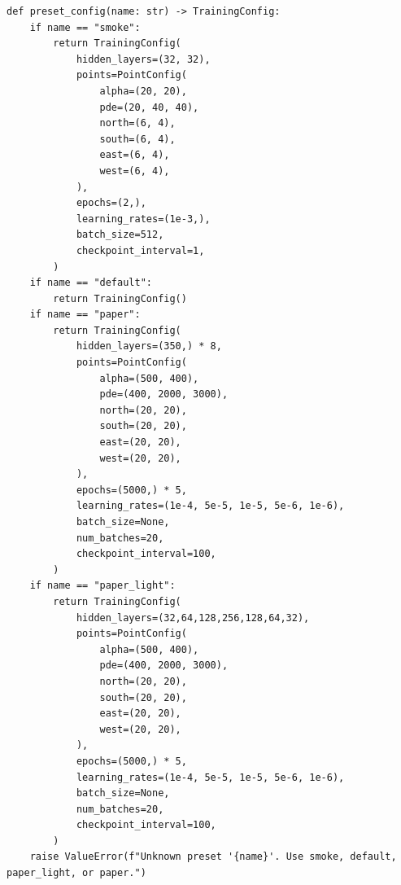 \begin{lstlisting}
def preset_config(name: str) -> TrainingConfig:
    if name == "smoke":
        return TrainingConfig(
            hidden_layers=(32, 32),
            points=PointConfig(
                alpha=(20, 20),
                pde=(20, 40, 40),
                north=(6, 4),
                south=(6, 4),
                east=(6, 4),
                west=(6, 4),
            ),
            epochs=(2,),
            learning_rates=(1e-3,),
            batch_size=512,
            checkpoint_interval=1,
        )
    if name == "default":
        return TrainingConfig()
    if name == "paper":
        return TrainingConfig(
            hidden_layers=(350,) * 8,
            points=PointConfig(
                alpha=(500, 400),
                pde=(400, 2000, 3000),
                north=(20, 20),
                south=(20, 20),
                east=(20, 20),
                west=(20, 20),
            ),
            epochs=(5000,) * 5,
            learning_rates=(1e-4, 5e-5, 1e-5, 5e-6, 1e-6),
            batch_size=None,
            num_batches=20,
            checkpoint_interval=100,
        )
    if name == "paper_light":
        return TrainingConfig(
            hidden_layers=(32,64,128,256,128,64,32),
            points=PointConfig(
                alpha=(500, 400),
                pde=(400, 2000, 3000),
                north=(20, 20),
                south=(20, 20),
                east=(20, 20),
                west=(20, 20),
            ),
            epochs=(5000,) * 5,
            learning_rates=(1e-4, 5e-5, 1e-5, 5e-6, 1e-6),
            batch_size=None,
            num_batches=20,
            checkpoint_interval=100,
        )
    raise ValueError(f"Unknown preset '{name}'. Use smoke, default, paper_light, or paper.")
\end{lstlisting}

